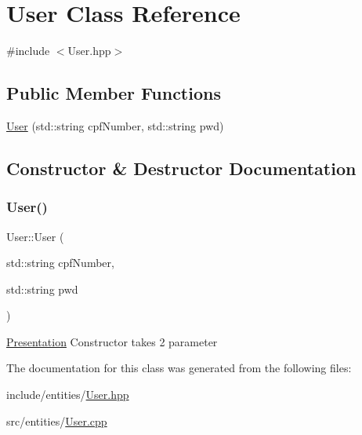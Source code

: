 \hypertarget{class_user}{}\section{User Class Reference}
\label{class_user}


{\ttfamily \#include $<$User.\+hpp$>$}

\subsection*{Public Member Functions}
\begin{DoxyCompactItemize}
\item 
\mbox{\hyperlink{class_user_a7c6d0d15a1c911264af6b190d7f1483b}{User}} (std\+::string cpf\+Number, std\+::string pwd)
\end{DoxyCompactItemize}


\subsection{Constructor \& Destructor Documentation}
\mbox{\label{class_user_a7c6d0d15a1c911264af6b190d7f1483b}} 
\subsubsection{\texorpdfstring{User()}{User()}}
{\footnotesize\ttfamily User\+::\+User (\begin{DoxyParamCaption}\item[{std\+::string}]{cpf\+Number,  }\item[{std\+::string}]{pwd }\end{DoxyParamCaption})}

\mbox{\hyperlink{class_presentation}{Presentation}} Constructor takes 2 parameter 

The documentation for this class was generated from the following files\+:\begin{DoxyCompactItemize}
\item 
include/entities/\mbox{\hyperlink{_user_8hpp}{User.\+hpp}}\item 
src/entities/\mbox{\hyperlink{_user_8cpp}{User.\+cpp}}\end{DoxyCompactItemize}
